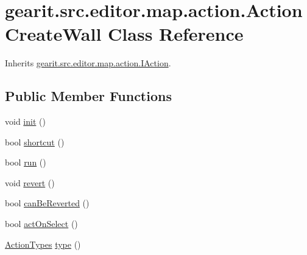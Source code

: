 \hypertarget{classgearit_1_1src_1_1editor_1_1map_1_1action_1_1_action_create_wall}{\section{gearit.\+src.\+editor.\+map.\+action.\+Action\+Create\+Wall Class Reference}
\label{classgearit_1_1src_1_1editor_1_1map_1_1action_1_1_action_create_wall}
}


Inherits \hyperlink{interfacegearit_1_1src_1_1editor_1_1map_1_1action_1_1_i_action}{gearit.\+src.\+editor.\+map.\+action.\+I\+Action}.

\subsection*{Public Member Functions}
\begin{DoxyCompactItemize}
\item 
void \hyperlink{classgearit_1_1src_1_1editor_1_1map_1_1action_1_1_action_create_wall_a55222b6268fd2688e5ed0a8f03d9fa5f}{init} ()
\item 
bool \hyperlink{classgearit_1_1src_1_1editor_1_1map_1_1action_1_1_action_create_wall_a18ffcb19e224ebf5ba2e36fcfbdb8a2b}{shortcut} ()
\item 
bool \hyperlink{classgearit_1_1src_1_1editor_1_1map_1_1action_1_1_action_create_wall_a81f7fb3a6979c1e4cbe7cd3e646ca178}{run} ()
\item 
void \hyperlink{classgearit_1_1src_1_1editor_1_1map_1_1action_1_1_action_create_wall_a5f8d2706da5d2a0928b15fa07376c4f1}{revert} ()
\item 
bool \hyperlink{classgearit_1_1src_1_1editor_1_1map_1_1action_1_1_action_create_wall_a1e9c2cb3ac027b9ef9f616315b076db0}{can\+Be\+Reverted} ()
\item 
bool \hyperlink{classgearit_1_1src_1_1editor_1_1map_1_1action_1_1_action_create_wall_a36d1a55d74ca51a7642ea621a71639ee}{act\+On\+Select} ()
\item 
\hyperlink{namespacegearit_1_1src_1_1editor_1_1map_1_1action_af036712a7d960b13d1e31954e65c00e3}{Action\+Types} \hyperlink{classgearit_1_1src_1_1editor_1_1map_1_1action_1_1_action_create_wall_a8171a714ff8c63cb78442b7d51d80842}{type} ()
\end{DoxyCompactItemize}


